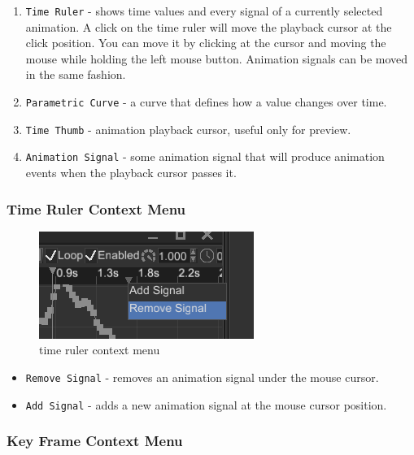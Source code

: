 \documentclass[
]{book}
\providecommand{\tightlist}{%
  \setlength{\itemsep}{0pt}\setlength{\parskip}{0pt}}
\theoremstyle{definition}
\theoremstyle{definition}
\theoremstyle{definition}
\theoremstyle{definition}
\theoremstyle{remark}
\begin{document}
\begin{enumerate}
\def\labelenumi{\arabic{enumi}.}
\tightlist
\item
  \texttt{Time\ Ruler} - shows time values and every signal of a currently selected animation. A click on the time ruler will move the playback cursor at the click position. You can move it by clicking at the cursor and moving the mouse while holding the left mouse button. Animation signals can be moved in the same fashion.
\item
  \texttt{Parametric\ Curve} - a curve that defines how a value changes over time.
\item
  \texttt{Time\ Thumb} - animation playback cursor, useful only for preview.
\item
  \texttt{Animation\ Signal} - some animation signal that will produce animation events when the playback cursor passes it.
\end{enumerate}

\subsubsection{Time Ruler Context Menu}\label{time-ruler-context-menu}

\begin{figure}
\centering
\includegraphics{images/animation/ae_time_ruler_context_menu.png}
\caption{time ruler context menu}
\end{figure}

\begin{itemize}
\tightlist
\item
  \texttt{Remove\ Signal} - removes an animation signal under the mouse cursor.
\item
  \texttt{Add\ Signal} - adds a new animation signal at the mouse cursor position.
\end{itemize}

\subsubsection{Key Frame Context Menu}\label{key-frame-context-menu}
\end{document}
